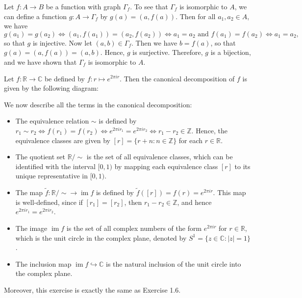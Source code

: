 \exercise Let $f : A \to B$ be a function with graph $\Gamma_f$. To see that $\Gamma_f$ is isomorphic to $A$, we can define a function $g : A \to \Gamma_f$ by $g(a) = (a, f(a))$. Then for all $a_1, a_2 \in A$, we have
\[g(a_1) = g(a_2) \iff (a_1, f(a_1)) = (a_2, f(a_2)) \iff a_1 = a_2 \text{ and } f(a_1) = f(a_2) \iff a_1 = a_2,\]
so that $g$ is injective. Now let $(a, b) \in \Gamma_f$. Then we have $b = f(a)$, so that $g(a) = (a, f(a)) = (a, b)$. Hence, $g$ is surjective. Therefore, $g$ is a bijection, and we have shown that $\Gamma_f$ is isomorphic to $A$.

\exercise Let $f : \mathbb R \to \mathbb C$ be defined by $f : r \mapsto e^{2\pi i r}$. Then the canonical decomposition of $f$ is given by the following diagram:
\begin{center}
\end{center}
We now describe all the terms in the canonical decomposition:
\begin{itemize}
    \item The equivalence relation $\sim$ is defined by $r_1 \sim r_2 \iff f(r_1) = f(r_2) \iff e^{2\pi i r_1} = e^{2\pi i r_2} \iff r_1 - r_2 \in \mathbb Z$. Hence, the equivalence classes are given by $[r] = \{r + n : n \in \mathbb Z\}$ for each $r \in \mathbb R$.
    \item The quotient set $\mathbb R/{\sim}$ is the set of all equivalence classes, which can be identified with the interval $[0, 1)$ by mapping each equivalence class $[r]$ to its unique representative in $[0, 1)$.
    \item The map $\tilde{f} : \mathbb R/{\sim} \to \operatorname{im} f$ is defined by $\tilde{f}([r]) = f(r) = e^{2\pi i r}$. This map is well-defined, since if $[r_1] = [r_2]$, then $r_1 - r_2 \in \mathbb Z$, and hence $e^{2\pi i r_1} = e^{2\pi i r_2}$.
    \item The image $\operatorname{im} f$ is the set of all complex numbers of the form $e^{2\pi i r}$ for $r \in \mathbb R$, which is the unit circle in the complex plane, denoted by $S^1 = \{z \in \mathbb C : |z| = 1\}$.
    \item The inclusion map $\operatorname{im} f \hookrightarrow \mathbb C$ is the natural inclusion of the unit circle into the complex plane.
\end{itemize}
Moreover, this exercise is exactly the same as Exercise 1.6.

